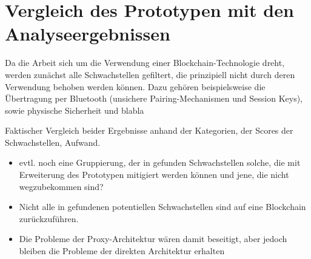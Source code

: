 \section{Vergleich des Prototypen mit den Analyseergebnissen}
\label{sec:comparison}
    Da die Arbeit sich um die Verwendung einer Blockchain-Technologie dreht, werden zunächst alle Schwachstellen gefiltert, die prinzipiell nicht durch deren Verwendung behoben werden können.
    Dazu gehören beispielsweise die Übertragung per Bluetooth (unsichere Pairing-Mechanismen und Session Keys), sowie physische Sicherheit und blabla

    Faktischer Vergleich beider Ergebnisse anhand der Kategorien, der Scores der Schwachstellen, Aufwand.
    \begin{itemize}[noitemsep]
        \item evtl. noch eine Gruppierung, der in  gefunden Schwachstellen solche, die mit Erweiterung des Prototypen mitigiert werden können und jene, die nicht wegzubekommen sind?
        \item Nicht alle in  gefundenen potentiellen Schwachstellen sind auf eine Blockchain zurückzuführen.
        \item Die Probleme der Proxy-Architektur wären damit beseitigt, aber jedoch bleiben die Probleme der direkten Architektur erhalten
    \end{itemize}
    
    